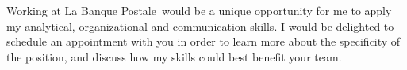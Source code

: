 \documentclass[11pt, a4paper]{awesome-cv}
\newcommand{\company}{La Banque Postale}
\begin{document}
\begin{cvletter}
Working at \company~would be a unique opportunity for me to apply my analytical, organizational and communication skills.  
I would be delighted to schedule an appointment with you in order to learn more about the specificity of the position, and discuss how my skills could best benefit your team. 
\end{cvletter}


\makeletterclosing
\end{document}
